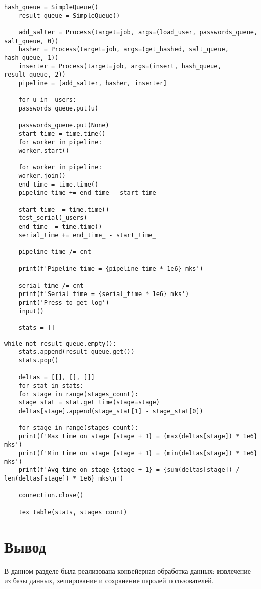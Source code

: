 \documentclass[../report.tex]{subfiles}
\begin{document}
\newpage
\begin{lstlisting}[caption=Файл master.py (часть 4)]
	hash_queue = SimpleQueue()
	result_queue = SimpleQueue()
	
	add_salter = Process(target=job, args=(load_user, passwords_queue, salt_queue, 0))
	hasher = Process(target=job, args=(get_hashed, salt_queue, hash_queue, 1))
	inserter = Process(target=job, args=(insert, hash_queue, result_queue, 2))
	pipeline = [add_salter, hasher, inserter]
	
	for u in _users:
	passwords_queue.put(u)
	
	passwords_queue.put(None)
	start_time = time.time()
	for worker in pipeline:
	worker.start()
	
	for worker in pipeline:
	worker.join()
	end_time = time.time()
	pipeline_time += end_time - start_time
	
	start_time_ = time.time()
	test_serial(_users)
	end_time_ = time.time()
	serial_time += end_time_ - start_time_
	
	pipeline_time /= cnt
	
	print(f'Pipeline time = {pipeline_time * 1e6} mks')
	
	serial_time /= cnt
	print(f'Serial time = {serial_time * 1e6} mks')
	print('Press to get log')
	input()
	
	stats = []
\end{lstlisting}
\newpage
\begin{lstlisting}[caption=Файл master.py (часть 5), label={lst:master}]
	while not result_queue.empty():
	stats.append(result_queue.get())
	stats.pop()
	
	deltas = [[], [], []]
	for stat in stats:
	for stage in range(stages_count):
	stage_stat = stat.get_time(stage=stage)
	deltas[stage].append(stage_stat[1] - stage_stat[0])
	
	for stage in range(stages_count):
	print(f'Max time on stage {stage + 1} = {max(deltas[stage]) * 1e6} mks')
	print(f'Min time on stage {stage + 1} = {min(deltas[stage]) * 1e6} mks')
	print(f'Avg time on stage {stage + 1} = {sum(deltas[stage]) / len(deltas[stage]) * 1e6} mks\n')
	
	connection.close()
	
	tex_table(stats, stages_count)
\end{lstlisting}


\section*{Вывод}
В данном разделе была реализована конвейерная обработка данных: извлечение из базы данных, хеширование и сохранение паролей пользователей.
\end{document}
